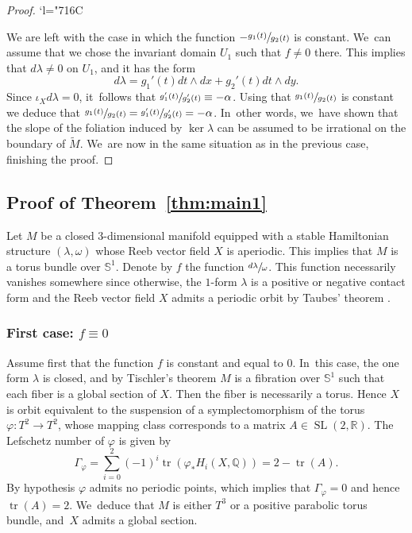 \documentclass[JEP,XML,SOM,Unicode,NoEqCountersInSection,NoFloatCountersInSection,published]{cedram}
\newcommand{\Changelback}{\mathcode`l="716C}
\DeclareMathOperator{\SL}{SL}
\theoremstyle{definition}
\newcommand{\mS}{\mathbb{S}}
\begin{document}
\begin{proof}
\Changelback

We are left with the case in which the function $-\sfrac{g_1(t)}{g_2(t)}$ is constant. We~can assume that we chose the invariant domain $U_1$ such that $f\neq 0$ there. This implies that $d\lambda \neq 0$ on $U_1$, and it has the form
\[
d\lambda= g_1'(t) dt\wedge dx + g_2'(t) dt\wedge dy.
\]
Since $\iota_Xd\lambda=0$, it~follows that $\sfrac{g_1'(t)}{g_2'(t)}\equiv -\alpha$. Using that $\sfrac{g_1(t)}{g_2(t)}$ is constant we deduce that $\sfrac{g_1(t)}{g_2(t)}=\sfrac{g_1'(t)}{g_2'(t)}=-{\alpha}$. In~other words, we~have shown that the slope of the foliation induced by $\ker \lambda$ can be assumed to be irrational on the boundary of $\widetilde M$. We~are now in the same situation as in the previous case, finishing the proof.
\end{proof}

\subsection{Proof of Theorem~\ref{thm:main1}}\label{ss:Tisch}

Let $M$ be a closed 3-dimensional manifold equipped with a stable Hamiltonian structure $(\lambda, \omega)$ whose Reeb vector field $X$ is aperiodic. This implies that $M$ is a torus bundle over $\mS^1$. Denote by $f$ the function $\sfrac{d\lambda}{\omega}$. This function necessarily vanishes somewhere since otherwise, the $1$-form $\lambda$ is a positive or negative contact form and the Reeb vector field $X$ admits a periodic orbit by Taubes' theorem
\cite{Taub}.

\subsubsection*{First case: $f\equiv 0$}
Assume first that the function $f$ is constant and equal to $0$. In~this case, the one form $\lambda$ is closed, and by Tischler's theorem \cite{Tis} $M$ is a fibration over $\mS^1$ such that each fiber is a global section of $X$. Then the fiber is necessarily a torus. Hence $X$ is orbit equivalent to the suspension of a symplectomorphism of the torus $\varphi:T^2\to T^2$, whose mapping class corresponds to a matrix $A\in \SL(2,\mathbb{R})$.
The Lefschetz number of $\varphi$ is given by
\begin{equation*}
\Gamma_{\varphi}=\sum_{i=0}^2 (-1)^i\operatorname{tr}(\varphi_*H_i(X,\mathbb{Q}))
								=2- \operatorname{tr}(A).
\end{equation*}
By hypothesis $\varphi$ admits no periodic points, which implies that $\Gamma_{\varphi}=0$ and hence $\operatorname{tr}(A)=2$. We~deduce that $M$ is either $T^3$ or a positive parabolic torus bundle, and~$X$ admits a global section.
\end{document}
